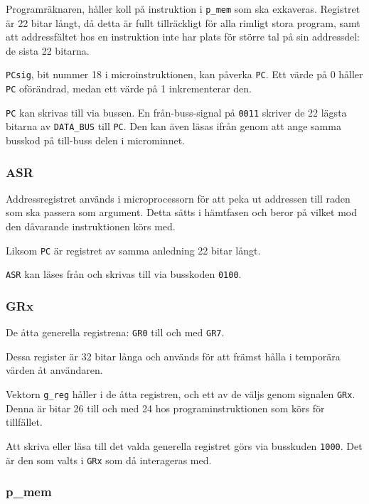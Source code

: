 \documentclass[]{article}
\begin{document}
Programräknaren, håller koll på instruktion i \texttt{p\_mem} som ska exkaveras. Registret är 22 bitar långt, då detta är fullt tillräckligt för alla rimligt stora program, samt att addressfältet hos en instruktion inte har plats för större tal på sin addressdel: de sista 22 bitarna.

\texttt{PCsig}, bit nummer 18 i microinstruktionen, kan påverka \texttt{PC}. Ett värde på 0 håller \texttt{PC} oförändrad, medan ett värde på 1 inkrementerar den.

\texttt{PC} kan skrivas till via bussen. En från-buss-signal på \texttt{0011} skriver de 22 lägsta bitarna av \texttt{DATA\_BUS} till \texttt{PC}. Den kan även läsas ifrån genom att ange samma busskod på till-buss delen i microminnet.

\subsubsection{ASR}

Addressregistret används i microprocessorn för att peka ut addressen till raden som ska passera som argument. Detta sätts i hämtfasen och beror på vilket mod den dåvarande instruktionen körs med.

Liksom \texttt{PC} är registret av samma anledning 22 bitar långt.

\texttt{ASR} kan läses från och skrivas till via busskoden \texttt{0100}.

\subsubsection{GRx}

De åtta generella registrena: \texttt{GR0} till och med \texttt{GR7}.

Dessa register är 32 bitar långa och används för att främst hålla i temporära värden åt användaren.

Vektorn \texttt{g\_reg} håller i de åtta registren, och ett av de väljs genom signalen \texttt{GRx}. Denna är bitar 26 till och med 24 hos programinstruktionen som körs för tillfället.

Att skriva eller läsa till det valda generella registret görs via busskuden \texttt{1000}. Det är den som valts i \texttt{GRx} som då interageras med. 

\subsubsection{p\_mem}
\end{document}
